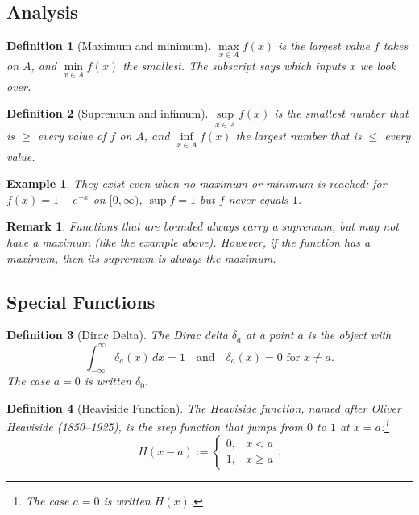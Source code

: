 \documentclass{article}
\newtheorem{definition}{Definition}
\newtheorem*{example}{Example}
\newtheorem{remark}{Remark}
\newcommand{\intinf}{\int_{-\infty}^{\infty}}
\begin{document}
\subsection{Analysis}
\begin{definition}[Maximum and minimum]
    $\underset{x\in A}{\max} f(x)$ is the largest value $f$ takes on $A$, and $\underset{x\in A}{\min} f(x)$ the smallest. The subscript says which inputs $x$ we look over.
\end{definition}
\begin{definition}[Supremum and infimum]
    $\underset{x\in A}{\sup} f(x)$ is the smallest number that is $\geq$ every value of $f$ on $A$, and $\underset{x\in A}{\inf} f(x)$ the largest number that is $\leq$ every value.
\end{definition}
\begin{example}
    They exist even when no maximum or minimum is reached: for $f(x)=1-e^{-x}$ on $[0,\infty)$, $\sup f = 1$ but $f$ never equals $1$.
\end{example}
\begin{remark}
    Functions that are bounded always carry a supremum, but may not have a maximum (like the example above). However, if the function has a maximum, then its supremum is always the maximum.
\end{remark}

\subsection{Special Functions}
\begin{definition}[Dirac Delta]
    \label{def:dirac-delta}
    The Dirac delta $\delta_a$ at a point $a$ is the object with
    \begin{equation}
        \label{eq:dirac-delta}
        \intinf\delta_a(x)\,dx = 1 \quad\text{and}\quad \delta_a(x) = 0 \text{ for } x\neq a.
    \end{equation}
    The case $a=0$ is written $\delta_0$.
\end{definition}
\begin{definition}[Heaviside Function]
    The Heaviside function, named after Oliver Heaviside (1850--1925), is the step function that jumps from $0$ to $1$ at $x=a$:\footnote{The case $a=0$ is written $H(x)$.}
    \begin{equation}
        \label{eq:heaviside}
        H(x-a) :=\begin{cases}0, & x<a\\1, & x\geq a\end{cases}.
    \end{equation}
\end{definition}
\end{document}
